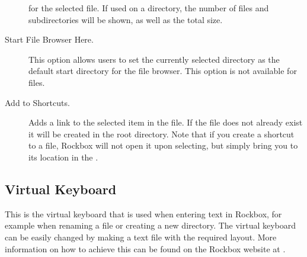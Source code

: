 \begin{description}
  for the selected file. If used on a directory, the number of files and
  subdirectories will be shown, as well as the total size.
\item [\label{ref:StartFileBrowserHere}Start File Browser Here.]
  This option allows users to set the currently selected directory as the default
  start directory for the file browser. This option is not available for files.
\item [Add to Shortcuts.]
  Adds a link to the selected item in the  file.
  If the file does not already exist it will be created in the root directory.
  Note that if you create a shortcut to a file, Rockbox will not open it upon
  selecting, but simply bring you to its location in the .
\end{description}

\subsection{\label{sec:virtual_keyboard}Virtual Keyboard}
This is the virtual keyboard that is used when entering text in Rockbox, for 
example when renaming a file or creating a new directory.
The virtual keyboard can be easily changed by making a text file
with the required layout. More information on how to achieve this can be found
on the Rockbox website at .




